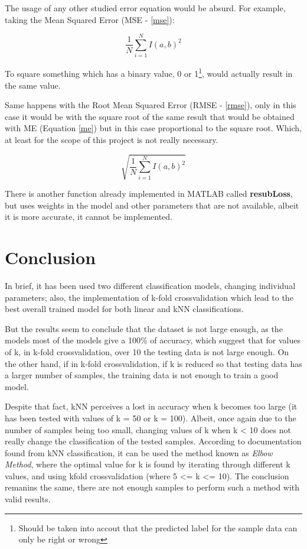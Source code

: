 \documentclass[11pt]{article}
\begin{document}
The usage of any other studied error equation would be absurd. For example,
taking the Mean Squared Error (MSE - \hyperref[mse]{\ref{mse}}):

\begin{equation}
 \frac{1}{N} \sum_{i=1}^{N} {I(a, b)^2} \label{mse}
\end{equation}

To square something which has a binary value, 0 or 1\footnote{Should be taken
into accout that the predicted label for the sample data can only be right or
wrong}, would actually result in the same value. 

Same happens with the Root Mean Squared Error (RMSE - 
\hyperref[rmse]{\ref{rmse}}), only in this case it would be with the square root 
of the same result that would be obtained with ME (Equation 
\hyperref[me]{\ref{me}}) but in this case proportional to the square root. 
Which, at least for the scope of this project is not really necessary.

\begin{equation}
 \sqrt{\frac{1}{N} \sum_{i=1}^{N} {I(a, b)^2}} \label{rmse}
\end{equation}

There is another function already implemented in MATLAB called 
\textbf{resubLoss}, but uses weights in the model and other parameters that are
not available, albeit it is more accurate, it cannot be implemented.

\section{Conclusion}

In brief, it has been used two different classification models, changing
individual parameters; also, the implementation of k-fold crossvalidation which
lead to the best overall trained model for both linear and kNN classifications.

But the results seem to conclude that the dataset is not large enough, as the
models most of the models give a 100\% of accuracy, which suggest that for
values of k, in k-fold crossvalidation, over 10 the testing data is not large 
enough. On the other hand, if in k-fold crossvalidation, if k is reduced so that 
testing data has a larger number of samples, the training data is not enough to 
train a good model.

Despite that fact, kNN perceives a lost in accuracy when k becomes too large
(it has been tested with values of k = 50 or k = 100). Albeit, once again due to
the number of samples being too small, changing values of k when k < 10 does not
really change the classification of the tested samples. According to
documentation found from kNN classification, it can be used the method known as
\textit{Elbow Method}, where the optimal value for k is found by iterating
through different k values, and using kfold crossvalidation (where 5 <= k <=
10). The conclusion remanins the same, there are not enough samples to perform
such a method with valid results.
\end{document}
